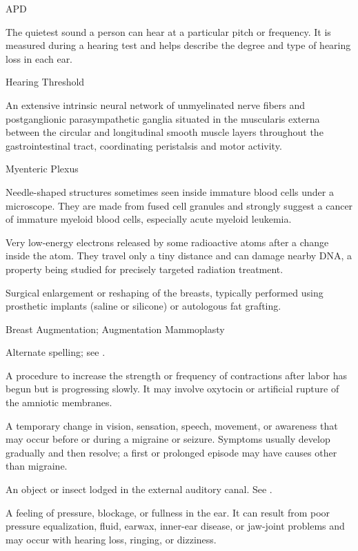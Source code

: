 \synonyms
APD

 The quietest sound a person can hear at a particular pitch or frequency. It is measured during a hearing test and helps describe the degree and type of hearing loss in each ear.

\synonyms
Hearing Threshold

 An extensive intrinsic neural network of unmyelinated nerve fibers and postganglionic parasympathetic ganglia situated in the muscularis externa between the circular and longitudinal smooth muscle layers throughout the gastrointestinal tract, coordinating peristalsis and motor activity.

\synonyms
Myenteric Plexus

 Needle-shaped structures sometimes seen inside immature blood cells under a microscope. They are made from fused cell granules and strongly suggest a cancer of immature myeloid blood cells, especially acute myeloid leukemia.

 Very low-energy electrons released by some radioactive atoms after a change inside the atom. They travel only a tiny distance and can damage nearby DNA, a property being studied for precisely targeted radiation treatment.

 Surgical enlargement or reshaping of the breasts, typically performed using prosthetic implants (saline or silicone) or autologous fat grafting.

\synonyms
Breast Augmentation; Augmentation Mammoplasty

 Alternate spelling; see .

 A procedure to increase the strength or
frequency of contractions after labor has begun but is progressing slowly. It
may involve oxytocin or artificial rupture of the amniotic membranes.

 A temporary change in vision, sensation, speech, movement, or awareness that may occur before or during a migraine or seizure. Symptoms usually develop gradually and then resolve; a first or prolonged episode may have causes other than migraine.

 An object or insect lodged in the external auditory canal. See .

 A feeling of pressure, blockage, or fullness in the ear. It can result from poor pressure equalization, fluid, earwax, inner-ear disease, or jaw-joint problems and may occur with hearing loss, ringing, or dizziness.

